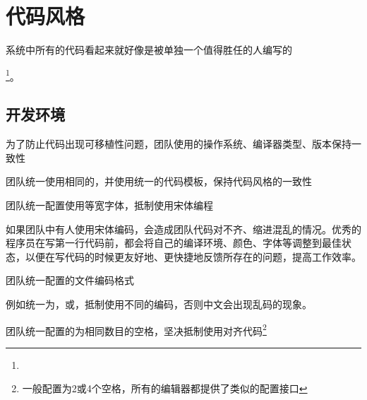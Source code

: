 \begin{savequote}[45mm]
\end{savequote}

\chapter{代码风格} 
\label{ch:physical-design}

\begin{content}

系统中所有的代码看起来就好像是被单独一个值得胜任的人编写的{\footnote{}。

\begin{end}

\section{开发环境}

\begin{content}

\begin{regulation}
为了防止代码出现可移植性问题，团队使用的操作系统、编译器类型、版本保持一致性
\end{regulation}

\begin{regulation}
团队统一使用相同的，并使用统一的代码模板，保持代码风格的一致性
\end{regulation}

\begin{regulation}
团队统一配置使用等宽字体，抵制使用宋体编程
\end{regulation}

如果团队中有人使用宋体编码，会造成团队代码对不齐、缩进混乱的情况。优秀的程序员在写第一行代码前，都会将自己的编译环境、颜色、字体等调整到最佳状态，以便在写代码的时候更友好地、更快捷地反馈所存在的问题，提高工作效率。

\begin{regulation}
团队统一配置的文件编码格式
\end{regulation}

例如统一为，或，抵制使用不同的编码，否则中文会出现乱码的现象。

\begin{regulation}
团队统一配置的为相同数目的空格，坚决抵制使用对齐代码\footnote{一般配置为2或4个空格，所有的编辑器都提供了类似的配置接口}
\end{regulation}


\end{content}
\end{end}}
\end{content}
